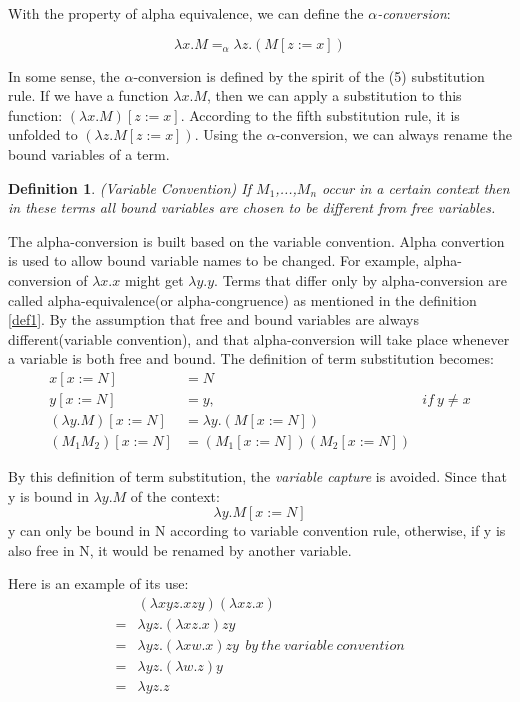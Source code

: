 \documentclass[a4paper,11pt,twoside]{report}
\newtheorem{def1}{\textbf{Definition}}[chapter]
\begin{document}
With the property of alpha equivalence, we can define the \textit{$\alpha$-conversion}:

\begin{equation*}
\lambda x.M =_\alpha \lambda z.(M[z:=x])
\end{equation*}

In some sense, the $\alpha$-conversion is defined by the spirit of the (5) substitution rule. If we have a function $\lambda x.M$, then we can apply a substitution to this function: $(\lambda x.M)[z:=x]$. According to the fifth substitution rule, it is unfolded to $(\lambda z.M[z:=x])$. Using the $\alpha$-conversion, we can always rename the bound variables of a term. 

\begin{def1}
(Variable Convention) If $M_1$,...,$M_n$ occur in a certain context then in these terms all bound variables are chosen to be different from free variables.
\end{def1}

The alpha-conversion is built based on the variable convention. Alpha convertion is used to allow bound variable names to be changed. For example, alpha-conversion of $\lambda x.x$ might get $\lambda y.y$. Terms that differ only by alpha-conversion are called alpha-equivalence(or alpha-congruence) as mentioned in the definition \ref{def1}. By the assumption that free and bound variables are always different(variable convention), and that alpha-conversion will take place whenever a variable is both free and bound. The definition of term substitution becomes:
\begin{equation*}
\begin{array}{rll}
x[x:=N]&=N & ~\\
y[x:=N]&=y,& if\ y\neq x\\
(\lambda y.M)[x:=N]&=\lambda y.(M[x:=N])& \\
(M_1M_2)[x:=N] &= (M_1[x:=N])(M_2[x:=N])&
\end{array} 
\end{equation*}

By this definition of term substitution, the \textit{variable capture} is avoided. Since that y is bound in $\lambda y.M$ of the context:
\begin{equation*}
\lambda y.M[x:=N]
\end{equation*}
y can only be bound in N according to variable convention rule, otherwise, if y is also free in N, it would be renamed by another variable. 

Here is an example of its use:
\begin{equation*}
\begin{array}{ll}
&(\lambda xyz.xzy)(\lambda xz.x)\\
=& \lambda yz.(\lambda xz.x)zy \\
=& \lambda yz.(\lambda xw.x)zy\ \ by\ the\ variable\ convention \\
=& \lambda yz.(\lambda w.z)y\\
=& \lambda yz.z\\
\end{array}
\end{equation*}
\end{document}
